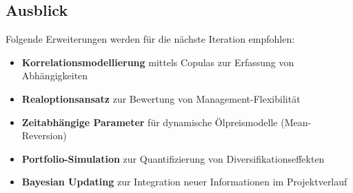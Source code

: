 \documentclass[11pt,a4paper]{article}
\begin{document}
\subsection{Ausblick}

Folgende Erweiterungen werden für die nächste Iteration empfohlen:

\begin{itemize}[itemsep=2pt]
  \item \textbf{Korrelationsmodellierung} mittels Copulas zur Erfassung von Abhängigkeiten
  \item \textbf{Realoptionsansatz} zur Bewertung von Management-Flexibilität
  \item \textbf{Zeitabhängige Parameter} für dynamische Ölpreismodelle (Mean-Reversion)
  \item \textbf{Portfolio-Simulation} zur Quantifizierung von Diversifikationseffekten
  \item \textbf{Bayesian Updating} zur Integration neuer Informationen im Projektverlauf
\end{itemize}
\end{document}
